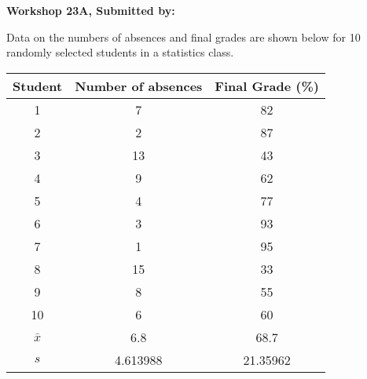\documentclass[11pt]{book}\usepackage[]{graphicx}\usepackage[]{color}
\begin{document}
\begin{exercises}
\begin{exercise}
\end{exercise}
\begin{solution}  %

\end{solution}

\clearpage

    \begin{exercise}  %

    \begin{center}
\begin{flushleft}\textbf{\large \hfill Workshop 23A, Submitted by: }\end{flushleft}

\end{center}

Data on the numbers of absences and final grades are shown below for 10 randomly selected students in a statistics class.

\begin{center}
\begin{tabular}{@{} ccc @{}} \hline
Student &	Number of absences &	Final Grade (\%) \\ \hline
1&	7&	82 \\
2&	2&	87 \\
3&	13&	43 \\
4&	9&	62 \\
5&	4&	77 \\
6&	3&	93 \\
7&	1&	95 \\
8&	15&	33 \\
9&	8&	55 \\
10&	6&	60 \\ \hline
$\bar{x}$ & 6.8 & 68.7 \\
$s$ & 4.613988 & 21.35962 \\ \hline
\end{tabular}
\end{center}


\end{exercise}
\end{exercises}
\end{document}
